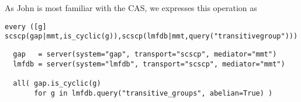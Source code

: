 As John is most familiar with the \Sage CAS, we expresses this operation as
\begin{lstlisting}
every ([g] scscp(gap|mmt,is_cyclic(g)),scscp(lmfdb|mmt,query("transitivegroup"))) 
\end{lstlisting}


\begin{lstlisting}
  gap   = server(system="gap", transport="scscp", mediator="mmt")
  lmfdb = server(system="lmfdb", transport="scscp", mediator="mmt")

  all( gap.is_cyclic(g)
       for g in lmfdb.query("transitive_groups", abelian=True) )
\end{lstlisting}


